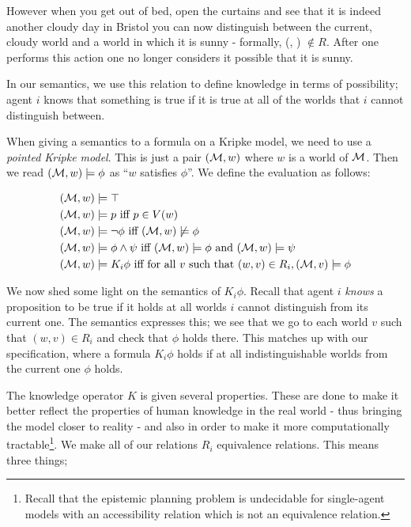 \documentclass[10pt, a4paper]{report}
\begin{document}
However when you get out of bed, open the curtains and see that it is indeed
another cloudy day in Bristol you can now distinguish between the current,
cloudy world and a world in which it is sunny - formally, (\Sun, \Cloud) $\not
\in R$. After one performs this action one no longer considers it possible that
it is sunny.

In our semantics, we use this relation to define knowledge in terms of
possibility; agent $i$ knows that something is true if it is true at all of the
worlds that $i$ cannot distinguish between.

When giving a semantics to a formula on a Kripke model, we need to use a
\emph{pointed Kripke model}. This is just a pair $(\mathcal{M}, w)$ where $w$ is a
world of $\mathcal{M}$. Then we read $(\mathcal{M}, w) \models \phi$ as ``$w$ satisfies
$\phi$''. We define the evaluation as follows:

\begin{align*}
  (\mathcal{M}, w) & \models \top \\
  (\mathcal{M}, w) & \models p \text{ iff } p \in V(w) \\
  (\mathcal{M}, w) & \models \neg \phi \text{ iff } (\mathcal{M}, w) \not \models \phi \\
  (\mathcal{M}, w) & \models \phi \land \psi \text{ iff } (\mathcal{M}, w) \models \phi \text{ and } (\mathcal{M}, w) \models \psi \\
  (\mathcal{M}, w) & \models K_i \phi \text{ iff for all $v$ such that } (w, v) \in R_i, (\mathcal{M}, v) \models \phi 
\end{align*}

We now shed some light on the semantics of $K_i \phi$. Recall that agent $i$
\emph{knows} a proposition to be true if it holds at all worlds $i$ cannot
distinguish from its current one. The semantics expresses this; we see that we
go to each world $v$ such that $(w, v) \in R_i$ and check that $\phi$ holds
there. This matches up with our specification, where a formula $K_i \phi$ holds
if at all indistinguishable worlds from the current one $\phi$ holds.

The knowledge operator $K$ is given several properties. These are done to make
it better reflect the properties of human knowledge in the real world - thus
bringing the model closer to reality - and also in order to make it more
computationally tractable\footnote{Recall that the epistemic planning problem is
  undecidable for single-agent models with an accessibility relation which is
  not an equivalence relation.}. We make all of our relations $R_i$ equivalence
relations. This means three things;
\end{document}
